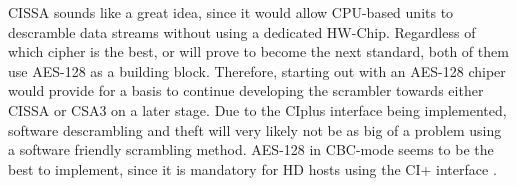 CISSA sounds like a great idea, since it would allow CPU-based units 
to descramble data streams without using a dedicated HW-Chip. Regardless
of which cipher is the best, or will prove to become the next standard, 
both of them use AES-128 as a building block. Therefore, starting out 
with an AES-128 chiper would provide for a basis to continue developing 
the scrambler towards either CISSA or CSA3 on a later stage. Due to the
CIplus interface being implemented, software descrambling and theft will
very likely not be as big of a problem using a software friendly 
scrambling method. AES-128 in CBC-mode seems to be the best to 
implement, since it is mandatory for HD hosts using the CI+ interface 
\citep[p. 15]{CI+:2011}.

